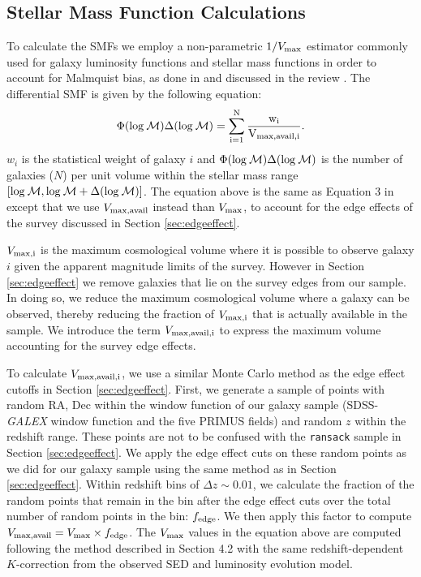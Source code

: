\documentclass{emulateapj}
\begin{document}
\subsection{Stellar Mass Function Calculations} \label{sec:smfcalc} 
To calculate the SMFs we employ a non-parametric $1/{V_{\rm{max}}}$ estimator commonly used for galaxy luminosity functions and stellar mass functions in order to account for Malmquist bias, as done in \cite{Moustakas:2013aa} and discussed in the review \cite{Johnston:2011aa}. The differential SMF is given by the following equation:
\begin{equation} \label{eq:phi}
\Phi(\rm{log}\: \mathcal{M}) \Delta(\rm{log} \:\mathcal{M}) = \sum\limits_{i=1}^{N} \frac{w_i}{V_{\rm{max,avail},i}}. 
\end{equation}
$w_i$ is the statistical weight of galaxy $i$ and $\Phi(\rm{log}\:
\mathcal{M}) \Delta(\rm{log}\: \mathcal{M})$ is the number of galaxies
($N$) per unit volume within the stellar mass range $[\rm{log}
  \:\mathcal{M}, \rm{log} \:\mathcal{M}+\Delta(\rm{log}
  \:\mathcal{M})]$. The equation above is the same as Equation 3 in \cite{Moustakas:2013aa} except that we use $V_{\rm{max,avail}}$ instead than $V_{\rm{max}}$, to account for the edge effects of the survey discussed in Section \ref{sec:edgeeffect}. 

$V_{\rm{max},i}$ is the maximum cosmological volume where it is
possible to observe galaxy $i$ given the apparent magnitude limits of
the survey. However in Section \ref{sec:edgeeffect} we remove galaxies
that lie on the survey edges from our sample. In doing so, we reduce the
maximum cosmological volume where a galaxy can be observed, thereby
reducing the fraction of $V_{\rm{max},i}$ that is actually available
in the sample. We introduce the term $V_{\rm{max,avail},i}$ to express
the maximum volume accounting for the survey edge effects.

To calculate $V_{\rm{max,avail},i}$, we use a similar Monte Carlo
method as the edge effect cutoffs in Section
\ref{sec:edgeeffect}. First, we generate a sample of points with
random RA, Dec within the window function of our galaxy sample
(SDSS-{\em GALEX} window function and the five PRIMUS fields) and
random $z$ within the redshift range. These points are not to be
confused with the \texttt{ransack} sample in Section
\ref{sec:edgeeffect}. We apply the edge effect cuts on these random
points as we did for our galaxy sample using the same method as in
Section \ref{sec:edgeeffect}. Within redshift bins of $\Delta z \sim
0.01$, we calculate the fraction of the random points that remain in
the bin after the edge effect cuts over the total number of random
points in the bin: $f_{\rm{edge}}$. We then apply this factor to
compute $V_{\rm{max,avail}} = V_{\rm{max}} \times f_{\rm{edge}}$. The
$V_{\rm{max}}$ values in the equation above are computed following the
method described in \cite{Moustakas:2013aa} Section 4.2 with the same
redshift-dependent $K$-correction from the observed SED and luminosity
evolution model.
\end{document}

